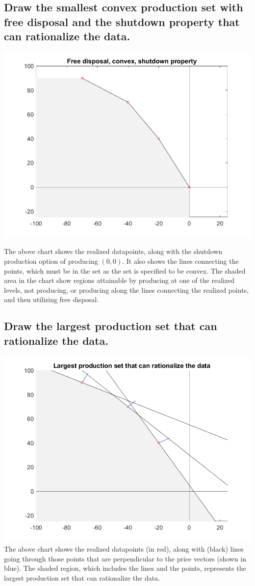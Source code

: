 \documentclass[11pt]{article} %
\begin{document}
\subsection{Draw the smallest convex production set with free disposal and the shutdown property that can rationalize the data.}
\includegraphics{freedispshutdown}

The above chart shows the realized datapoints, along with the shutdown production option of producing $(0,0)$. It also shows the lines connecting the points, which must be in the set as the set is specified to be convex. The shaded area in the chart show regions attainable by producing at one of the realized levels, not producing, or producing along the lines connecting the realized points, and then utilizing free disposal.

\subsection{Draw the largest production set that can rationalize the data.}
\includegraphics{largestprod}
The above chart shows the realized datapoints (in red), along with (black) lines going through those points that are perpendicular to the price vectors (shown in blue). The shaded region, which includes the lines and the points, represents the largest production set that can rationalize the data.
\end{document}
